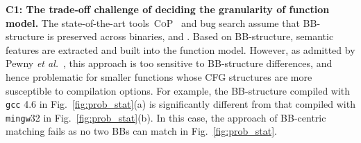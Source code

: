 \noindent\textbf{C1: The trade-off challenge of deciding the granularity of function model.} %
The state-of-the-art tools~\textsc{CoP}~\cite{luo2014semantics} and bug search \cite{DBLP:conf/sp/PewnyGGRH15} assume that BB-structure is preserved across binaries, and . Based on BB-structure, semantic features are extracted and built into the function model. However, as admitted by Pewny \emph{et al.}~\cite{DBLP:conf/sp/PewnyGGRH15}, this approach is too sensitive to BB-structure differences, and hence problematic for smaller functions whose CFG structures are more susceptible to compilation options.
For example, the BB-structure compiled with  \texttt{gcc} 4.6 in  Fig.~\ref{fig:prob_stat}(a) is significantly different from that compiled with \texttt{mingw}32 in Fig.~\ref{fig:prob_stat}(b). In this case, the approach of BB-centric matching fails as no two BBs can match in Fig.~\ref{fig:prob_stat}.        %






